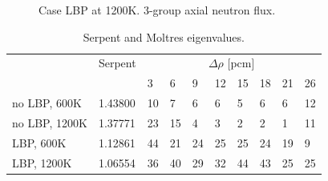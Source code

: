 \documentclass[11pt,letterpaper]{article}
\begin{document}
\begin{figure}[htbp!]
  \centering
  \hfill
    \caption{Case LBP at 1200K. 3-group axial neutron flux.}
  \label{fig:assembly-LBP-1200-flux}
\end{figure}

\begin{table}[htbp!]
  \centering
  \caption{Serpent and Moltres eigenvalues.}
  \begin{tabular}{l|l|llllllll}
  \toprule
              & Serpent 					& \multicolumn{8}{c}{$\Delta \rho$ [pcm]}            \\ \cline{3-10} 
              &              			& 3   & 6   & 9   & 12   & 15   & 18   & 21   & 26   \\
  \midrule
no LBP, 600K  & 1.43800           & 10  & 7   & 6   & 6    & 5    & 6    & 6    & 12   \\
no LBP, 1200K & 1.37771           & 23  & 15  & 4   & 3    & 2    & 2    & 1    & 11   \\
LBP, 600K     & 1.12861           & 44  & 21  & 24  & 25   & 25   & 24   & 19   & 9    \\
LBP, 1200K    & 1.06554           & 36  & 40  & 29  & 32   & 44   & 43   & 25   & 25   \\
  \bottomrule
  \end{tabular}
  \label{tab:keff}
\end{table}
\end{document}
